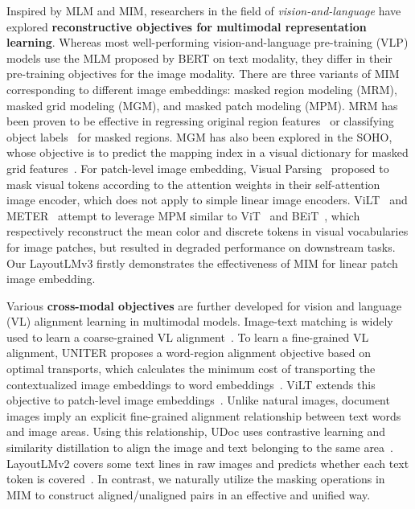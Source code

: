 \documentclass[sigconf]{acmart}
\begin{document}
Inspired by MLM and MIM, researchers in the field of \emph{vision-and-language} have explored \textbf{reconstructive objectives for multimodal representation learning}.
Whereas most well-performing vision-and-language pre-training (VLP) models use the MLM proposed by BERT on text modality, they differ in their pre-training objectives for the image modality.
There are three variants of MIM corresponding to different image embeddings: masked region modeling (MRM), masked grid modeling (MGM), and masked patch modeling (MPM).
MRM has been proven to be effective in regressing original region features~\cite{tan2019lxmert,chen2020uniter,li2021selfdoc} or classifying object labels~\cite{chen2020uniter,lu2019vilbert,tan2019lxmert} for masked regions.
MGM has also been explored in the SOHO, whose objective is to predict the mapping index in a visual dictionary for masked grid features~\cite{huang2021seeing}.
For patch-level image embedding, Visual Parsing~\cite{xue2021probing} proposed to mask visual tokens according to the attention weights in their self-attention image encoder, which does not apply to simple linear image encoders.
ViLT~\cite{kim2021vilt} and METER~\cite{dou2021empirical} attempt to leverage MPM similar to ViT~\cite{dosovitskiy2020vit} and BEiT~\cite{bao2022beit}, which respectively reconstruct the mean color and discrete tokens in visual vocabularies for image patches, but resulted in degraded performance on downstream tasks.
Our LayoutLMv3 firstly demonstrates the effectiveness of MIM for linear patch image embedding.

Various \textbf{cross-modal objectives} are further developed for vision and language (VL) alignment learning in multimodal models.
Image-text matching is widely used to learn a coarse-grained VL alignment~\cite{chen2020uniter,huang2021seeing,kim2021vilt,xu-etal-2021-layoutlmv2,Appalaraju_2021_ICCV}.
To learn a fine-grained VL alignment, UNITER proposes a word-region alignment objective based on optimal transports, which calculates the minimum cost of transporting the contextualized image embeddings to word embeddings~\cite{chen2020uniter}.
ViLT extends this objective to patch-level image embeddings~\cite{kim2021vilt}.
Unlike natural images, document images imply an explicit fine-grained alignment relationship between text words and image areas.
Using this relationship, UDoc uses contrastive learning and similarity distillation to align the image and text belonging to the same area~\cite{gu2021unidoc}.
LayoutLMv2 covers some text lines in raw images and predicts whether each text token is covered~\cite{xu-etal-2021-layoutlmv2}.
In contrast, we naturally utilize the masking operations in MIM to construct aligned/unaligned pairs in an effective and unified way.
\end{document}
